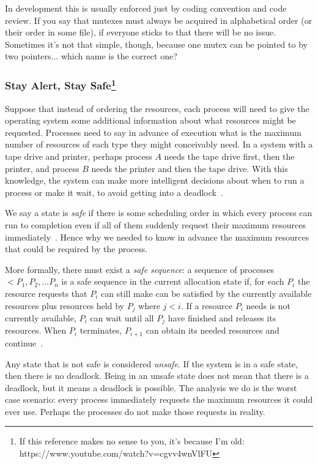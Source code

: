 In development this is usually enforced just by coding convention and code review. If you say that mutexes must always be acquired in alphabetical order (or their order in some file), if everyone sticks to that there will be no issue. Sometimes it's not that simple, though, because one mutex can be pointed to by two pointers... which name is the correct one?

\subsubsection*{Stay Alert, Stay Safe\footnote{If this reference makes no sense to you, it's because I'm old: https://www.youtube.com/watch?v=cgvv4wnVlFU}}

Suppose that instead of ordering the resources, each process will need to give the operating system some additional information about what resources might be requested. Processes need to say in advance of execution what is the maximum number of resources of each type they might conceivably need. In a system with a tape drive and printer, perhaps process $A$ needs the tape drive first, then the printer, and process $B$ needs the printer and then the tape drive. With this knowledge, the system can make more intelligent decisions about when to run a process or make it wait, to avoid getting into a deadlock~\cite{osc}.

We say a state is \textit{safe} if there is some scheduling order in which every process can run to completion even if all of them suddenly request their maximum resources immediately~\cite{mos}. Hence why we needed to know in advance the maximum resources that could be required by the process.

More formally, there must exist a \textit{safe sequence}: a sequence of processes $<P_{1}, P_{2}, ... P_{n}$ is a safe sequence in the current allocation state if, for each $P_{i}$ the resource requests that $P_{i}$ can still make can be satisfied by the currently available resources plus resources held by $P_{j}$ where $j < i$. If a resource $P_{i}$ needs is not currently available, $P_{i}$ can wait until all $P_{j}$ have finished and releases its resources. When $P_{i}$ terminates, $P_{i+1}$ can obtain its needed resources and continue~\cite{osc}.

Any state that is not safe is considered \textit{unsafe}. If the system is in a safe state, then there is no deadlock. Being in an unsafe state does not mean that there is a deadlock, but it means a deadlock is possible. The analysis we do is the worst case scenario: every process immediately requests the maximum resources it could ever use. Perhaps the processes do not make those requests in reality.

